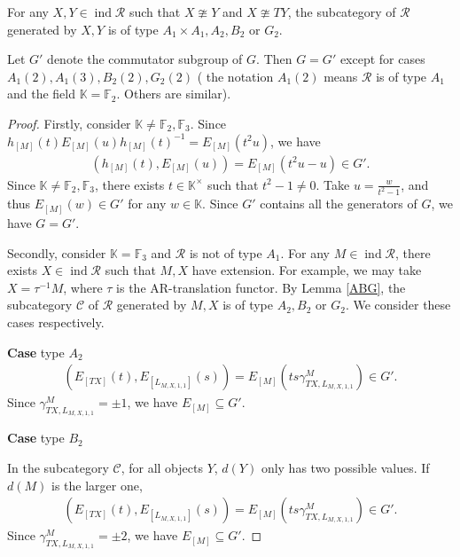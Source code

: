 \documentclass[10pt,a4paper]{amsart}
\begin{document}
\begin{lemma}\label{ABG}
    For any $X,Y\in \operatorname{ind}\mathcal{R}$ such that $X\ncong Y$ and $X\ncong TY$, the subcategory of $\mathcal{R}$ generated by $X,Y$ is of type $A_1\times A_1,A_2,B_2$ or $G_2$.
\end{lemma}

\begin{proposition}
    Let $G'$ denote the commutator subgroup of $G$. 
    Then $G=G'$ except for cases $A_1(2),A_1(3),B_2(2),G_2(2)$ ( the notation $A_1(2)$ means $\mathcal{R}$ is of type $A_1$ and the field $\mathbb{K}=\mathbb{F}_2$. Others are similar).
\end{proposition}

\begin{proof}
    Firstly, consider $\mathbb{K}\neq \mathbb{F}_2,\mathbb{F}_3$. 
    Since $h_{[M]}(t) E_{[M]}(u) h_{[M]}(t)^{-1} = E_{[M]}(t^2u)$, we have
    \begin{align*}
        (h_{[M]}(t),E_{[M]}(u)) = E_{[M]}(t^2u-u) \in G'.
    \end{align*}
    Since $\mathbb{K}\neq \mathbb{F}_2,\mathbb{F}_3$, there exists $t\in \mathbb{K}^{\times}$ such that $t^2 - 1 \neq 0$.
    Take $u=\frac{w}{t^2-1}$, and thus $E_{[M]}(w)\in G'$ for any $w\in \mathbb{K}$.
   Since $G'$ contains all the generators of $G$, we have $G=G'$.

   Secondly, consider $\mathbb{K}=\mathbb{F}_3$ and $\mathcal{R}$ is not of type $A_1$.
   For any $M\in \operatorname{ind}\mathcal{R}$, there exists $X\in \operatorname{ind}\mathcal{R}$ such that $M,X$ have extension.
   For example, we may take $X=\tau^{-1}M $, where $\tau$ is the AR-translation functor.
   By Lemma \ref{ABG}, the subcategory $\mathcal{C}$ of $\mathcal{R}$ generated by $M,X$ is of type $A_2,B_2$ or $G_2$.
   We consider these cases respectively.

   \textbf{Case} type $A_2$
   \begin{align*}
    (E_{[TX]}(t),E_{[L_{M,X,1,1}]}(s)) = E_{[M]}(ts\gamma_{TX,L_{M,X,1,1}}^{M} ) \in G'.
   \end{align*} 
   Since $\gamma_{TX,L_{M,X,1,1}}^{M} = \pm 1$, we have $E_{[M]}\subseteq  G'$.

   \textbf{Case} type $B_2$

   In the subcategory $\mathcal{C}$, for all objects $Y$, $d(Y)$ only has two possible values.
   If $d(M)$ is the larger one,
   \begin{align*}
    (E_{[TX]}(t),E_{[L_{M,X,1,1}]}(s)) = E_{[M]}(ts\gamma_{TX,L_{M,X,1,1}}^{M} ) \in G'.
   \end{align*}
   Since $\gamma_{TX,L_{M,X,1,1}}^{M} = \pm 2$, we have $E_{[M]}\subseteq  G'$.


\end{proof}
\end{document}
